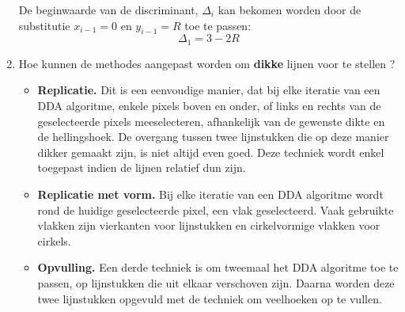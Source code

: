 \documentclass{report}
\newcommand{\vraag}[2]{
	\item #1
	
	#2
}
\begin{document}
\begin{enumerate}
{\begin{itemize}
				De beginwaarde van de discriminant, $\Delta_i$ kan bekomen worden door de substitutie $x_{i - 1} = 0$ en $y_{i - 1} = R$ toe te passen:
				$$\Delta_1 = 3 - 2R$$
				
			\end{itemize}

		}

		
		\vraag
		{
			Hoe kunnen de methodes aangepast worden om \textbf{dikke} lijnen voor te stellen ? \accentuate{(§1.5)}
		}
		{
			\begin{itemize}
				\item \textbf{Replicatie.} Dit is een eenvoudige manier, dat bij elke iteratie van een DDA algoritme, enkele pixels boven en onder, of links en rechts van de geselecteerde pixels meeselecteren, afhankelijk van de gewenste dikte en de hellingshoek. De overgang tussen twee lijnstukken die op deze manier dikker gemaakt zijn, is niet altijd even goed. Deze techniek wordt enkel toegepast indien de lijnen relatief dun zijn.
				\item \textbf{Replicatie met vorm.} Bij elke iteratie van een DDA algoritme wordt rond de huidige geselecteerde pixel, een vlak geselecteerd. Vaak gebruikte vlakken zijn vierkanten voor lijnstukken en cirkelvormige vlakken voor cirkels.
				
				\item \textbf{Opvulling.} Een derde techniek is om tweemaal het DDA algoritme toe te passen, op lijnstukken die uit elkaar verschoven zijn. Daarna worden deze twee lijnstukken opgevuld met de techniek om veelhoeken op te vullen.
			\end{itemize}
		}
	\end{enumerate}
\end{document}
